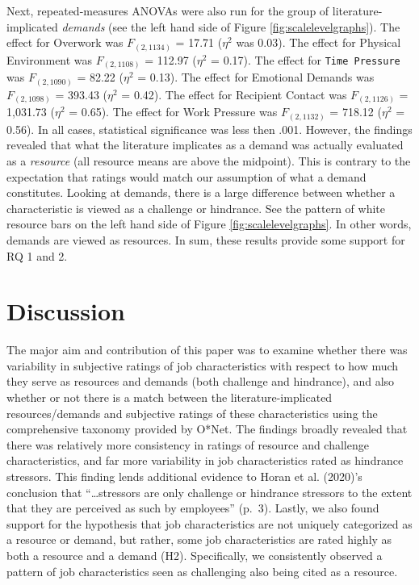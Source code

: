 \documentclass[
  man,mask]{apa7}
\begin{document}
Next, repeated-measures ANOVAs were also run for the group of literature-implicated \emph{demands} (see the left hand side of Figure \ref{fig:scalelevelgraphs}). The effect for Overwork was \(F_{(2, 1134)}\) = 17.71 (\(\eta^2\) was 0.03). The effect for Physical Environment was \(F_{(2, 1108)}\) = 112.97 (\(\eta^2\) = 0.17). The effect for \texttt{Time\ Pressure} was \(F_{(2, 1090)}\) = 82.22 (\(\eta^2\) = 0.13). The effect for Emotional Demands was \(F_{(2, 1098)}\) = 393.43 (\(\eta^2\) = 0.42).
The effect for Recipient Contact was \(F_{(2, 1126)}\) = 1,031.73 (\(\eta^2\) = 0.65). The effect for Work Pressure was \(F_{(2, 1132)}\) = 718.12 (\(\eta^2\) = 0.56). In all cases, statistical significance was less then .001. However, the findings revealed that what the literature implicates as a demand was actually evaluated as a \emph{resource} (all resource means are above the midpoint). This is contrary to the expectation that ratings would match our assumption of what a demand constitutes. Looking at demands, there is a large difference between whether a characteristic is viewed as a challenge or hindrance. See the pattern of white resource bars on the left hand side of Figure \ref{fig:scalelevelgraphs}. In other words, demands are viewed as resources. In sum, these results provide some support for RQ 1 and 2.

\hypertarget{discussion}{%
\section{Discussion}\label{discussion}}

The major aim and contribution of this paper was to examine whether there was variability in subjective ratings of job characteristics with respect to how much they serve as resources and demands (both challenge and hindrance), and also whether or not there is a match between the literature-implicated resources/demands and subjective ratings of these characteristics using the comprehensive taxonomy provided by O*Net. The findings broadly revealed that there was relatively more consistency in ratings of resource and challenge characteristics, and far more variability in job characteristics rated as hindrance stressors. This finding lends additional evidence to Horan et al. (2020)'s conclusion that ``\ldots stressors are only challenge or hindrance stressors to the extent that they are perceived as such by employees'' (p.~3). Lastly, we also found support for the hypothesis that job characteristics are not uniquely categorized as a resource or demand, but rather, some job characteristics are rated highly as both a resource and a demand (H2). Specifically, we consistently observed a pattern of job characteristics seen as challenging also being cited as a resource.
\end{document}
